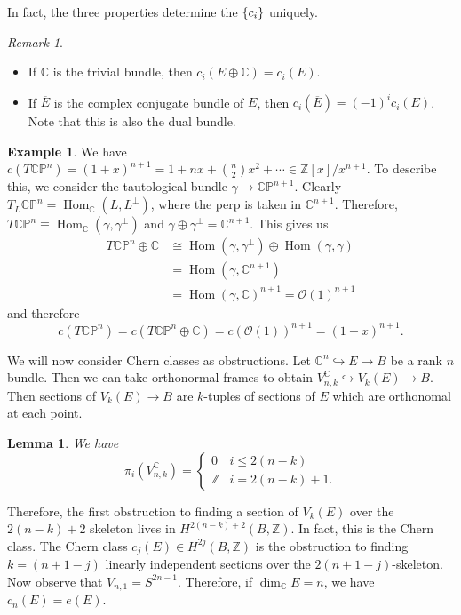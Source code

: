 \documentclass[leqno, openany]{memoir}
\newtheorem{lem}[thm]{Lemma}
\theoremstyle{definition}
\newtheorem{exm}[thm]{Example}
\theoremstyle{remark}
\newtheorem{rmk}[thm]{Remark}
\theoremstyle{plain}
\theoremstyle{definition}
\theoremstyle{remark}
\newcommand{\C}{\mathbb{C}}
\newcommand{\Z}{\mathbb{Z}}
\renewcommand{\P}{\mathbb{P}}
\newcommand{\mc}[1]{\mathcal{#1}}
\newcommand{\ol}[1]{\overline{#1}}
\DeclareMathOperator{\Hom}{Hom}
\begin{document}
In fact, the three properties determine the $\qty{c_i}$ uniquely.

\begin{rmk}
    \begin{itemize}
        \item If $\C$ is the trivial bundle, then $c_i(E \oplus \C) = c_i(E)$.
        \item If $\ol{E}$ is the complex conjugate bundle of $E$, then $c_i(\ol{E}) = {(-1)}^i c_i(E)$. Note that this is also the dual bundle.
    \end{itemize}
\end{rmk}

\begin{exm}
    We have $c(T \C\P^n) = {(1+x)}^{n+1} = 1 + nx + \binom{n}{2} x^2 + \cdots \in \Z[x]/x^{n+1}$. To describe this, we consider the tautological bundle $\gamma \to \C\P^{n+1}$. Clearly $T_L \C\P^n = \Hom_{\C}(L, L^{\perp})$, where the perp is taken in $\C^{n+1}$. Therefore, $T \C\P^n \equiv \Hom_{\C}(\gamma, \gamma^{\perp})$ and $\gamma \oplus \gamma^{\perp} = \C^{n+1}$. This gives us
    \begin{align*}
        T \C\P^n \oplus \C &\cong \Hom(\gamma, \gamma^{\perp}) \oplus \Hom(\gamma, \gamma) \\
                           &= \Hom(\gamma, \C^{n+1}) \\
                           &= {\Hom(\gamma, \C)}^{n+1} = {\mc{O}(1)}^{n+1}
    \end{align*}
    and therefore 
    \[ c(T\C\P^n) = c(T\C\P^n \oplus \C) = {c(\mc{O}(1))}^{n+1} = {(1+x)}^{n+1}. \]
\end{exm}

We will now consider Chern classes as obstructions. Let $\C^n \hookrightarrow E \to B$ be a rank $n$ bundle. Then we can take orthonormal frames to obtain $V_{n, k}^{\C} \hookrightarrow V_k(E) \to B$. Then sections of $V_k(E) \to B$ are $k$-tuples of sections of $E$ which are orthonomal at each point.

\begin{lem}
    We have
    \[ \pi_i(V_{n,k}^{\C}) = \begin{cases}
        0 & i \leq 2 (n-k) \\
        \Z & i = 2(n-k) + 1.
    \end{cases} \]
\end{lem}

Therefore, the first obstruction to finding a section of $V_k(E)$ over the $2(n-k) + 2$ skeleton lives in $H^{2(n-k)+2}(B, \Z)$. In fact, this is the Chern class. The Chern class $c_j(E) \in H^{2j}(B, \Z)$ is the obstruction to finding $k = (n+1-j)$ linearly independent sections over the $2(n+1-j)$-skeleton. Now observe that $V_{n,1} = S^{2n-1}$. Therefore, if $\dim_{\C} E = n$, we have $c_n(E) = e(E)$.
\end{document}
